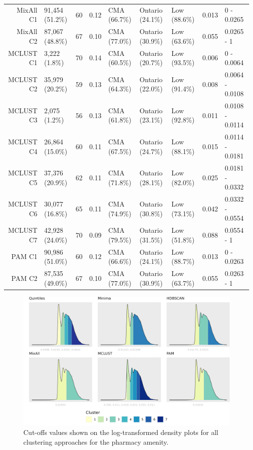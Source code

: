 \documentclass[11pt, a4paper]{article}
\begin{document}
\begin{table}[H]
{\begin{tabular}{|r|llllllll|}
  MixAll C1 & 91,454 (51.2\%) & 60 & 0.12 & CMA (66.7\%) & Ontario (24.1\%) & Low (88.6\%) & 0.013 & 0 - 0.0265 \\
  MixAll C2 & 87,067 (48.8\%) & 67 & 0.10 & CMA (77.0\%) & Ontario (30.9\%) & Low (63.6\%) & 0.055 & 0.0265 - 1 \\
 \rowcolor{gray!25} MCLUST C1 & 3,222 (1.8\%) & 70 & 0.14 & CMA (60.5\%) & Ontario (20.7\%) & Low (93.5\%) & 0.006 & 0 - 0.0064 \\
 \rowcolor{gray!25} MCLUST C2 & 35,979 (20.2\%) & 59 & 0.13 & CMA (64.3\%) & Ontario (22.0\%) & Low (91.4\%) & 0.008 & 0.0064 - 0.0108 \\
 \rowcolor{gray!25} MCLUST C3 & 2,075 (1.2\%) & 56 & 0.13 & CMA (61.8\%) & Ontario (23.1\%) & Low (92.8\%) & 0.011 & 0.0108 - 0.0114 \\
 \rowcolor{gray!25} MCLUST C4 & 26,864 (15.0\%) & 60 & 0.11 & CMA (67.5\%) & Ontario (24.7\%) & Low (88.1\%) & 0.015 & 0.0114 - 0.0181 \\
 \rowcolor{gray!25} MCLUST C5 & 37,376 (20.9\%) & 62 & 0.11 & CMA (71.8\%) & Ontario (28.1\%) & Low (82.0\%) & 0.025 & 0.0181 - 0.0332 \\
 \rowcolor{gray!25} MCLUST C6 & 30,077 (16.8\%) & 65 & 0.11 & CMA (74.9\%) & Ontario (30.8\%) & Low (73.1\%) & 0.042 & 0.0332 - 0.0554 \\
 \rowcolor{gray!25} MCLUST C7 & 42,928 (24.0\%) & 70 & 0.09 & CMA (79.5\%) & Ontario (31.5\%) & Low (51.8\%) & 0.088 & 0.0554 - 1 \\
  PAM C1 & 90,986 (51.0\%) & 60 & 0.12 & CMA (66.6\%) & Ontario (24.1\%) & Low (88.7\%) & 0.013 & 0 - 0.0263 \\
  PAM C2 & 87,535 (49.0\%) & 67 & 0.10 & CMA (77.0\%) & Ontario (30.9\%) & Low (63.7\%) & 0.055 & 0.0263 - 1 \\
   \hline
\end{tabular}
}
\end{table}





\begin{figure}[H]
\centering
\includegraphics[width=\textwidth]{./cutoffs/by_amenity/Pharmacy_cutoffs.png}
\caption[Pharmacy cutoffs]{Cut-offs values shown on the log-transformed density plots for all clustering approaches for the pharmacy amenity.}\label{pharmacycutoffs}
\end{figure}
\end{document}
